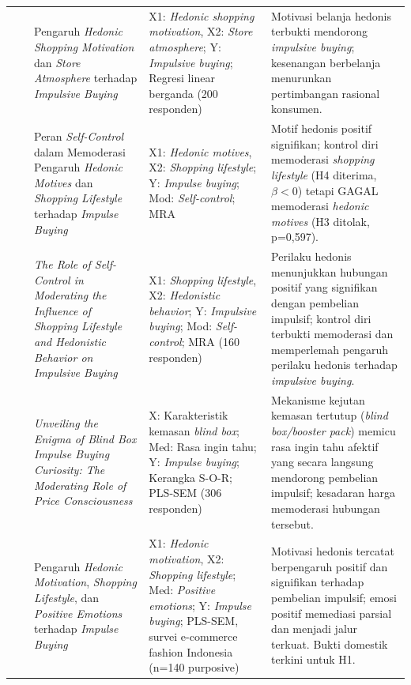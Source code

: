 \documentclass[12pt,a4paper]{article}
\numberwithin{equation}{section}
\numberwithin{table}{section}
\numberwithin{figure}{section}
\begin{document}
\begin{longtable}{>{\centering\arraybackslash}p{0.5cm} >{\raggedright\arraybackslash}p{2.3cm} >{\raggedright\arraybackslash}p{3.2cm} >{\raggedright\arraybackslash}p{2.6cm} >{\raggedright\arraybackslash}p{3.9cm}}
1 & \citet{pranggabayu2022pengaruh} & Pengaruh \emph{Hedonic Shopping Motivation} dan \emph{Store Atmosphere} terhadap \emph{Impulsive Buying} & X1: \emph{Hedonic shopping motivation}, X2: \emph{Store atmosphere}; Y: \emph{Impulsive buying}; Regresi linear berganda (200 responden) & Motivasi belanja hedonis terbukti mendorong \emph{impulsive buying}; kesenangan berbelanja menurunkan pertimbangan rasional konsumen. \\
\addlinespace[4pt]
2 & \citet{apidana2022peran} & Peran \emph{Self-Control} dalam Memoderasi Pengaruh \emph{Hedonic Motives} dan \emph{Shopping Lifestyle} terhadap \emph{Impulse Buying} & X1: \emph{Hedonic motives}, X2: \emph{Shopping lifestyle}; Y: \emph{Impulse buying}; Mod: \emph{Self-control}; MRA & Motif hedonis positif signifikan; kontrol diri memoderasi \emph{shopping lifestyle} (H4 diterima, $\beta<0$) tetapi GAGAL memoderasi \emph{hedonic motives} (H3 ditolak, p=0,597). \\
\addlinespace[4pt]
3 & \citet{lienardy2026role} & \emph{The Role of Self-Control in Moderating the Influence of Shopping Lifestyle and Hedonistic Behavior on Impulsive Buying} & X1: \emph{Shopping lifestyle}, X2: \emph{Hedonistic behavior}; Y: \emph{Impulsive buying}; Mod: \emph{Self-control}; MRA (160 responden) & Perilaku hedonis menunjukkan hubungan positif yang signifikan dengan pembelian impulsif; kontrol diri terbukti memoderasi dan memperlemah pengaruh perilaku hedonis terhadap \emph{impulsive buying}. \\
\addlinespace[4pt]
4 & \citet{gong2024unveiling} & \emph{Unveiling the Enigma of Blind Box Impulse Buying Curiosity: The Moderating Role of Price Consciousness} & X: Karakteristik kemasan \emph{blind box}; Med: Rasa ingin tahu; Y: \emph{Impulse buying}; Kerangka S-O-R; PLS-SEM (306 responden) & Mekanisme kejutan kemasan tertutup (\emph{blind box/booster pack}) memicu rasa ingin tahu afektif yang secara langsung mendorong pembelian impulsif; kesadaran harga memoderasi hubungan tersebut. \\
\addlinespace[4pt]
5 & \citet{azizah2025exploring} & Pengaruh \emph{Hedonic Motivation}, \emph{Shopping Lifestyle}, dan \emph{Positive Emotions} terhadap \emph{Impulse Buying} & X1: \emph{Hedonic motivation}, X2: \emph{Shopping lifestyle}; Med: \emph{Positive emotions}; Y: \emph{Impulse buying}; PLS-SEM, survei e-commerce fashion Indonesia (n=140 purposive) & Motivasi hedonis tercatat berpengaruh positif dan signifikan terhadap pembelian impulsif; emosi positif memediasi parsial dan menjadi jalur terkuat. Bukti domestik terkini untuk H1. \\

\end{longtable}
\end{document}
